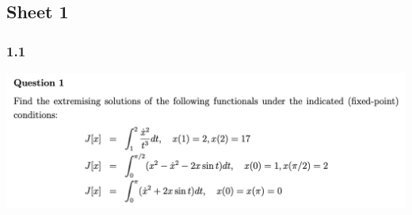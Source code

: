 \subsection{Sheet 1}
\subsubsection{1.1}
\begin{mdframed}
  \includegraphics[width=400pt]{img/cov-haliakis-ooc-1-1.png}
\end{mdframed}
